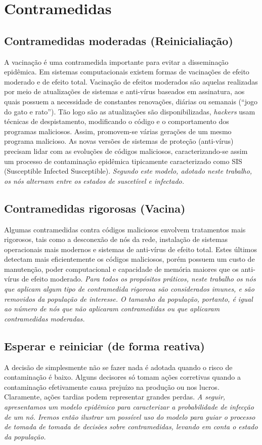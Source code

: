 	
\section{Contramedidas}

    \subsection{Contramedidas moderadas (Reinicialiação)}	

        A vacinação é uma contramedida importante para evitar a disseminação epidêmica. Em sistemas computacionais existem formas de vacinações de efeito moderado e de efeito total. Vacinação de efeitos moderados são aquelas realizadas por meio de atualizações de sistemas e anti-vírus baseados em assinatura, aos quais possuem a necessidade de constantes renovações, diárias ou semanais (``jogo do gato e rato''). Tão logo são as atualizações são disponibilizadas, \textit{hackers} usam técnicas de despistamento, modificando o código e o comportamento dos programas maliciosos.  Assim, promovem-se  várias gerações de um mesmo programa malicioso. As novas versões de sistemas de proteção (anti-vírus) precisam lidar com as evoluções de códigos maliciosos, caracterizando-se assim um processo  de contaminação epidêmica tipicamente caracterizado como SIS (Susceptible Infected Susceptible). \emph{ Segundo este modelo, adotado neste trabalho, os nós alternam entre os estados de suscetível e infectado.}


    \subsection{Contramedidas rigorosas (Vacina)}	
    	Algumas contramedidas contra códigos maliciosos envolvem tratamentos mais rigorosos, tais como a desconexão de nós da rede, instalação de sistemas operacionais mais modernos e sistemas de anti-vírus de efeito total. Estes últimos detectam mais eficientemente os códigos maliciosos, porém possuem um custo de manutenção, poder computacional e capacidade de memória maiores que os anti-vírus de efeito moderado. \emph{Para todos os propósitos práticos, neste trabalho os nós que aplicam algum tipo de contramedida rigorosa são  considerados imunes, e são removidos da população de interesse. O tamanho da população, portanto, é igual ao número de nós que não aplicaram contramedidas ou que aplicaram contramedidas moderadas.	}

    \subsection{Esperar e reiniciar (de forma reativa) }
        A decisão de simplesmente não se fazer nada é adotada quando o risco de contaminação é baixo. Alguns decisores só tomam ações corretivas quando a contaminação efetivamente causa prejuízo na produção ou nos lucros. Claramente, ações tardias podem representar grandes perdas. \emph{A seguir, apresentamos um modelo epidêmico para caracterizar a probabilidade de infecção de um nó.  Iremos então ilustrar um possível uso do modelo para guiar o processo de tomada de tomada de decisões sobre contramedidas, levando em conta o estado  da população.} 

